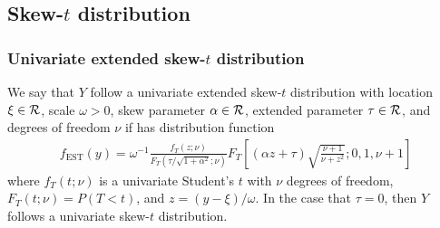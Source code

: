 \documentclass[11pt]{article}
\begin{document}

\subsection{Skew-$t$ distribution} \label{a:skewt}
\subsubsection*{Univariate extended skew-$t$ distribution}
We say that $Y$ follow a univariate extended skew-$t$ distribution with location $\xi \in {\cal R}$, scale $\omega > 0$, skew parameter $\alpha \in {\cal R}$, extended parameter $\tau \in {\cal R}$, and degrees of freedom $\nu$ if has distribution function
\begin{align}
  f_{\text{EST}}(y) = \omega^{-1} \frac{ f_T (z; \nu) }{ F_T(\tau / \sqrt{ 1 + \alpha^2}; \nu)} F_T\left[ (\alpha z + \tau) \sqrt{ \frac{ \nu + 1 }{ \nu + z^2}}; 0, 1, \nu + 1 \right]
\end{align}
where $f_T(t; \nu)$ is a univariate Student's $t$ with $\nu$ degrees of freedom, $F_T(t; \nu) = P(T < t)$, and \hbox{$z = (y - \xi) / \omega$}.
In the case that $\tau = 0$, then $Y$ follows a univariate skew-$t$ distribution.
\end{document}
